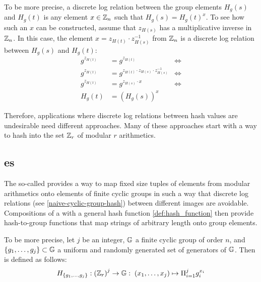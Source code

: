 \begin{example}
To be more precise, a discrete log relation between the group elements $H_g(s)$ and $H_g(t)$ is any element $x\in \mathbb{Z}_n$ such that $H_g(s) = H_g(t)^x$. To see how such an $x$ can be constructed, assume that $z_{H(s)}$ has a multiplicative inverse in $\mathbb{Z}_n$. In this case, the element $x=z_{H(t)}\cdot z_{H(s)}^{-1}$ from $\mathbb{Z}_n$ is a discrete log relation between $H_g(s)$ and $H_g(t)$:
\begin{align*}
g^{z_{H(t)}} & = g^{z_{H(t)}} & \Leftrightarrow\\
g^{z_{H(t)}} & = g^{z_{H(t)}\cdot z_{H(s)}\cdot z_{H(s)}^{-1}} & \Leftrightarrow \\
g^{z_{H(t)}} & = g^{z_{H(s)}\cdot x} & \Leftrightarrow \\
H_g(t) & = (H_g(s))^x
\end{align*}
\end{example}
Therefore, applications where discrete log relations between hash values are undesirable need different approaches. Many of these approaches start with a way to hash into the set $\mathbb{Z}_r$ of modular $r$ arithmetics.

\subsection{es}
\label{def:Pedersen_hash}
The so-called  \citep{Pedersen92} provides a way to map fixed size tuples of elements from modular arithmetics onto elements of finite cyclic groups in such a way that discrete log relations (see \examplename{} \ref{naive-cyclic-group-hash}) between different images are avoidable. Compositions of a  with a general hash function \eqref{def:hash_function} then provide hash-to-group functions that map strings of arbitrary length onto group elements.

To be more precise, let $j$ be an integer, $\mathbb{G}$ a finite cyclic group of order $n$, and $\{g_1, \ldots, g_j\} \subset \mathbb{G}$ a uniform and randomly generated set of generators of $\mathbb{G}$. Then  is defined as follows:
\begin{equation}\label{eq:Pedersen_hash}
H_{\{g_1,\ldots,g_j\}} : \left(\mathbb{Z}_r\right)^j \to \mathbb{G}:\; (x_1,\ldots,x_j)\mapsto \Pi_{i=1}^j g_i^{x_i}
\end{equation}

